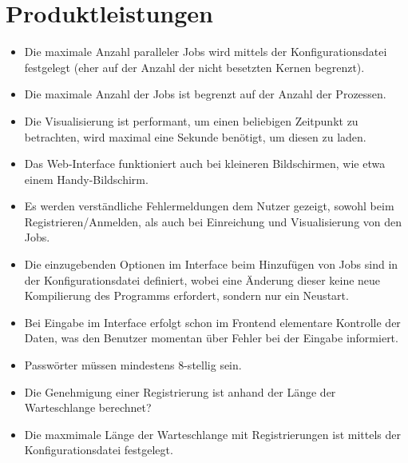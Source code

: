 \section{Produktleistungen}

%
%
%
%
%

\begin{itemize}
    \item Die maximale Anzahl paralleler Jobs wird mittels der Konfigurationsdatei festgelegt (eher auf der Anzahl der nicht besetzten Kernen begrenzt). 
    \item Die maximale Anzahl der Jobs ist begrenzt auf der Anzahl der Prozessen.
    \item Die Visualisierung ist performant, um einen beliebigen Zeitpunkt zu betrachten, wird maximal eine Sekunde benötigt, um diesen zu laden. 
    \item Das Web-Interface funktioniert auch bei kleineren Bildschirmen, wie etwa einem Handy-Bildschirm.
    \item Es werden verständliche Fehlermeldungen dem Nutzer gezeigt, sowohl beim Registrieren/Anmelden, als auch bei Einreichung und Visualisierung von den Jobs.
    \item Die einzugebenden Optionen im Interface beim Hinzufügen von Jobs sind in der Konfigurationsdatei definiert, wobei eine Änderung dieser keine neue Kompilierung des Programms erfordert, sondern nur ein Neustart.
    \item Bei Eingabe im Interface erfolgt schon im Frontend elementare Kontrolle der Daten, was den Benutzer momentan über Fehler bei der Eingabe informiert.
    \item Passwörter müssen mindestens 8-stellig sein.
    \item Die Genehmigung einer Registrierung ist anhand der Länge der Warteschlange berechnet?
    \item Die maxmimale Länge der Warteschlange mit Registrierungen ist mittels der Konfigurationsdatei festgelegt.

\end{itemize}
